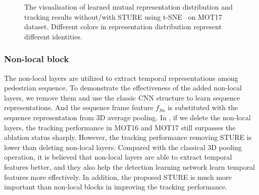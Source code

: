 \documentclass[times,twocolumn,final,authoryear]{elsarticle}
\begin{document}
\begin{figure}[htbp]
	\centering
	\caption{The visualisation of learned mutual representation distribution and tracking results without/with STURE using t-SNE~\citep{van2008visualizing} {on} MOT17 dataset.
		Different colors in representation distribution represent different identities. 
	}
	\label{fig:tsne}
\end{figure}






\vspace{5pt}
\noindent
\subsubsection{Non-local block}
The non-local layers are utilized to extract temporal representations among pedestrian sequence.
To demonstrate the effectiveness of the added non-local layers, we remove them and use the classic CNN structure to learn sequence representations. 
And the sequence frame feature $f_{Sn}$ is substituted with the sequence representation from 3D average pooling.
In , if we delete the non-local layers, the tracking performance in MOT16 and MOT17 still surpasses the ablation status sharply.
However, the tracking performance removing STURE is lower than deleting non-local layers.
Compared with the classical 3D pooling operation, it is believed that non-local layers are able to extract temporal features better,
and they also help the detection learning network learn temporal features more effectively. 
In addition, the proposed STURE is much more important than non-local blocks in improving the tracking performance.
\end{document}
